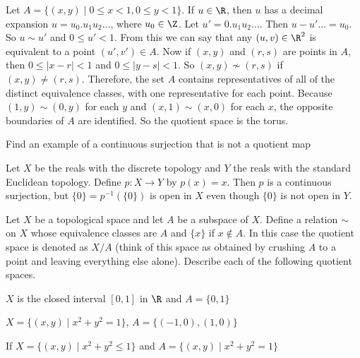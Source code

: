 \item Let $A = \{(x,y) \mid 0 \leq x < 1, 0 \leq y < 1\}$. If $u \in \R$, then $u$ has a decimal expansion $u = u_0.u_1u_2 \ldots$, where $u_0 \in \Z$. Let $u' = 0.u_1u_2 \ldots$. Then $u - u' \ldots = u_0$. So $u \sim u'$ and $0 \leq u' < 1$. From this we can say that any $(u,v) \in \R^2$ is equivalent to a point $(u',v') \in A$. Now if $(x,y)$ and $(r,s)$ are points in $A$, then $0 \leq |x-r| < 1$ and $0 \leq |y-s| < 1$. So $(x,y) \not\sim (r,s)$ if $(x,y) \neq (r,s)$. Therefore, the set $A$ contains representatives of all of the distinct equivalence classes, with one representative for each point. Because $(1,y) \sim (0,y)$ for each $y$ and $(x,1) \sim (x,0)$ for each $x$, the opposite boundaries of $A$ are identified. So the quotient space is the torus. 

\ea


\item Find an example of a continuous surjection that is not a quotient map


\ExerciseSolution Let $X$ be the reals with the discrete topology and $Y$ the reals with the standard Euclidean topology. Define $p : X \to Y$ by $p(x) = x$. Then $p$ is a continuous surjection, but $\{0\} = p^{-1}(\{0\})$ is open in $X$ even though $\{0\}$ is not open in $Y$.  



\item Let $X$ be a topological space and let $A$ be a subspace of $X$. Define a relation $\sim$ on $X$ whose equivalence classes are $A$ and $\{x\}$ if $x \notin A$. In this case the quotient space is denoted as $X/A$ (think of this space as obtained by crushing $A$ to a point and leaving everything else alone). Describe each of the following quotient spaces.
\ba

\item  $X$ is the closed interval $[0,1]$ in $\R$ and $A = \{0,1\}$

\item $X = \{(x,y) \mid x^2+y^2 = 1\}$, $A = \{(-1,0), (1,0)\}$

\item If $X= \{(x,y) \mid x^2+y^2 \leq 1\}$ and $A = \{(x,y) \mid x^2+y^2 = 1\}$

